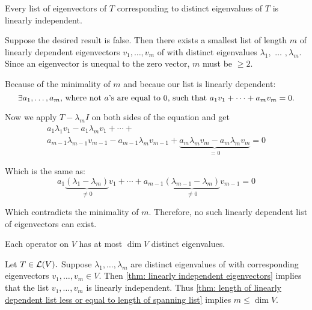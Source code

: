 \setcounter{thm}{10}
\begin{thm}
  \label{thm: linearly independent eigenvectors}
  Every list of eigenvectors of $T$ corresponding to distinct eigenvalues of $T$ is linearly independent.
\end{thm}
\begin{prf}
  Suppose the desired result is false. Then there exists a smallest list of length $m$ of linearly depen\-dent eigenvectors $v_1, \dots, v_m$ of with distinct eigenvalues $\lambda_1,$ $\dots$ $,\lambda_m$. Since an eigenvector is unequal to the zero vector, $m$ must be $\geq 2$.

  Because of the minimality of $m$ and becaue our list is linearly dependent:
  \begin{equation}
    \exists a_1, \dots, a_m$, where not $a$'s are equal to $0$, such that $a_1 v_1 + \cdots + a_m v_m = 0.
  \end{equation}

  Now we apply $T-\lambda_m I$ on both sides of the equation and get
  \begin{equation}
    \begin{gathered}
      a_1 \lambda_1 v_1 - a_1 \lambda_m v_1
      + \cdots + \\
      a_{m-1} \lambda_{m-1} v_{m-1} - a_{m-1} \lambda_{m} v_{m-1} +
      \underbrace{a_m \lambda_m v_m -a_m \lambda_m v_m}_{=0} =0
    \end{gathered}
  \end{equation}

  Which is the same as:
  \begin{equation}
    a_1 \underbrace{(\lambda_1 - \lambda_m)}_{\neq 0} v_1 + \cdots + a_{m-1} \underbrace{(\lambda_{m-1}-\lambda_{m})}_{\neq 0} v_{m-1}=0
  \end{equation}

  Which contradicts the minimality of $m$. Therefore, no such linearly dependent list of eigenvectors can exist.
\end{prf}

\begin{thm}
  \label{thm: operator cannot have more eigenvalues than dimension of vector space}
  Each operator on $V$ has at most $\dim V$ distinct eigenvalues.
\end{thm}
\begin{prf}
  Let $T \in \mathcal{L}(V).$ Suppose $\lambda_1, \ldots, \lambda_m$ are distinct eigenvalues of with corresponding eigenvectors $v_1, \ldots, v_m \in V$. Then \ref{thm: linearly independent eigenvectors} implies that the list $v_1, \ldots, v_m$ is linearly independent. Thus \ref{thm: length of linearly dependent list less or equal to length of spanning list}
  implies $m \leq \dim V$.
\end{prf}


